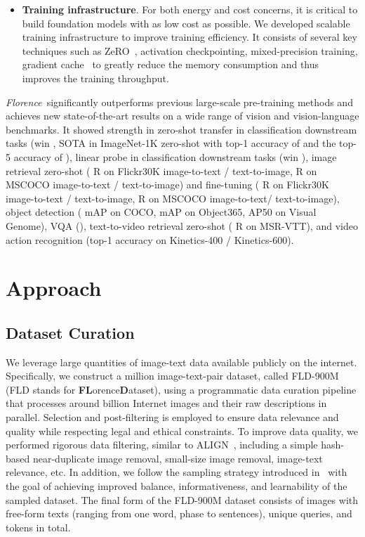 \documentclass{article}
\newcommand{\Florence}{\emph{Florence~}}
\begin{document}
\begin{itemize}
    \item \textbf{Training infrastructure}. For both energy and cost concerns, it is critical to build foundation models with as low cost as possible. We developed scalable training infrastructure to improve training efficiency. It consists of several key techniques such as ZeRO~\cite{DBLP:journals/corr/abs-1910-02054}, activation checkpointing, mixed-precision training, gradient cache~\cite{gao2021scaling} to greatly reduce the memory consumption and thus improves the training throughput.

\end{itemize}



\Florence significantly outperforms previous large-scale pre-training methods and achieves new state-of-the-art results on a wide range of vision and vision-language benchmarks. It showed strength in zero-shot transfer in  classification downstream tasks (win , SOTA in ImageNet-1K zero-shot with top-1 accuracy of {} and the top-5 accuracy of {}), linear probe in  classification downstream tasks (win ), image retrieval zero-shot ({} R on Flickr30K image-to-text / text-to-image, {} R on MSCOCO image-to-text / text-to-image) and fine-tuning ({} R on Flickr30K image-to-text / text-to-image, {} R on MSCOCO image-to-text/ text-to-image), object detection ({} mAP on COCO, {} mAP on Object365, {} AP50 on Visual Genome), VQA ({}), text-to-video retrieval zero-shot ({} R on MSR-VTT), and video action recognition (top-1 accuracy {} on Kinetics-400 / Kinetics-600).


\section{Approach}

\subsection{Dataset Curation}

We leverage large quantities of image-text data available publicly on the internet. Specifically,
we construct a  million image-text-pair dataset, called FLD-900M (FLD stands for {\bf{FL}}orence{\bf{D}}ataset), using a programmatic data curation pipeline that processes around  billion Internet images and their raw descriptions in parallel. Selection and post-filtering is employed to ensure data relevance
and quality while respecting legal and ethical constraints. To improve data quality, we
performed rigorous data filtering, similar to ALIGN~\cite{jia2021scaling}, including a simple
hash-based near-duplicate image removal, small-size image removal, image-text relevance, etc. In addition, we follow the sampling strategy introduced in~\cite{radford2021learning, ramesh2021zeroshot} with the
goal of achieving improved balance, informativeness, and learnability of the sampled dataset. The final form of the FLD-900M dataset consists of  images with  free-form texts (ranging from one word, phase to sentences),  unique queries, and  tokens in total.
\end{document}

